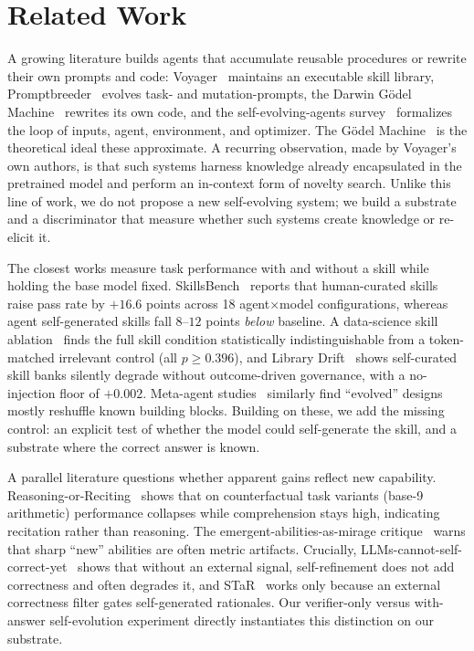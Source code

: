 \section{Related Work}
\label{sec:related}

 A growing literature builds agents that
accumulate reusable procedures or rewrite their own prompts and code:
Voyager~\citep{voyager} maintains an executable skill library, Promptbreeder~\citep{promptbreeder}
evolves task- and mutation-prompts, the Darwin G\"odel Machine~\citep{dgm} rewrites its own
code, and the self-evolving-agents survey~\citep{selfevolvesurvey} formalizes the loop of
inputs, agent, environment, and optimizer. The G\"odel Machine~\citep{godelmachine} is the
theoretical ideal these approximate. A recurring observation, made by Voyager's own authors,
is that such systems harness knowledge already encapsulated in the pretrained model and
perform an in-context form of novelty search. Unlike this line of work, we do not propose a
new self-evolving system; we build a substrate and a discriminator that measure whether such
systems create knowledge or re-elicit it.

 The closest works measure task performance with and without
a skill while holding the base model fixed. SkillsBench~\citep{skillsbench} reports that
human-curated skills raise pass rate by $+16.6$ points across 18 agent$\times$model
configurations, whereas agent self-generated skills fall $8$--$12$ points \emph{below}
baseline. A data-science skill ablation~\citep{dsskills} finds the full skill condition
statistically indistinguishable from a token-matched irrelevant control (all $p\geq0.396$), and
Library Drift~\citep{librarydrift} shows self-curated skill banks silently degrade without
outcome-driven governance, with a no-injection floor of $+0.002$. Meta-agent
studies~\citep{metaagents} similarly find ``evolved'' designs mostly reshuffle known building
blocks. Building on these, we add the missing control: an explicit test of whether the model
could self-generate the skill, and a substrate where the correct answer is known.

 A parallel literature questions whether apparent
gains reflect new capability. Reasoning-or-Reciting~\citep{reasoningreciting} shows that on
counterfactual task variants (\eg base-9 arithmetic) performance collapses while comprehension
stays high, indicating recitation rather than reasoning. The emergent-abilities-as-mirage
critique~\citep{mirage} warns that sharp ``new'' abilities are often metric artifacts.
Crucially, LLMs-cannot-self-correct-yet~\citep{cannotselfcorrect} shows that without an
external signal, self-refinement does not add correctness and often degrades it, and
STaR~\citep{star} works only because an external correctness filter gates self-generated
rationales. Our verifier-only versus with-answer self-evolution experiment directly
instantiates this distinction on our substrate.

